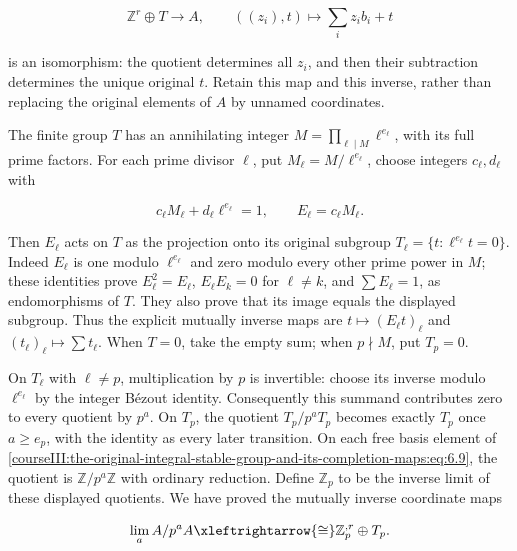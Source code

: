 \begin{equation}
\mathbb Z^r\oplus T\longrightarrow A,
 \qquad ((z_i),t)\longmapsto\sum_i z_i b_i+t
 \label{courseIII:the-original-integral-stable-group-and-its-completion-maps:eq:6.9}
\end{equation}

is an isomorphism: the quotient determines all \(z_i\), and then their subtraction determines the unique original \(t\). Retain this map and this inverse, rather than replacing the original elements of \(A\) by unnamed coordinates.

The finite group \(T\) has an annihilating integer
\(M=\prod_{\ell\mid M}\ell^{e_\ell}\), with its full prime factors. For each prime divisor \(\ell\), put \(M_\ell=M/\ell^{e_\ell}\), choose integers \(c_\ell,d_\ell\) with

\begin{equation}
c_\ell M_\ell+d_\ell\ell^{e_\ell}=1,
 \qquad E_\ell=c_\ell M_\ell.
 \label{courseIII:the-original-integral-stable-group-and-its-completion-maps:eq:6.10}
\end{equation}

Then \(E_\ell\) acts on \(T\) as the projection onto its original subgroup
\(T_\ell=\{t:\ell^{e_\ell}t=0\}\). Indeed \(E_\ell\) is one modulo \(\ell^{e_\ell}\) and zero modulo every other prime power in \(M\); these identities prove \(E_\ell^2=E_\ell\), \(E_\ell E_k=0\) for \(\ell\ne k\), and \(\sum E_\ell=1\), as endomorphisms of \(T\). They also prove that its image equals the displayed subgroup. Thus the explicit mutually inverse maps are \(t\mapsto(E_\ell t)_\ell\) and \((t_\ell)_\ell\mapsto\sum t_\ell\). When \(T=0\), take the empty sum; when \(p\nmid M\), put \(T_p=0\).

On \(T_\ell\) with \(\ell\ne p\), multiplication by \(p\) is invertible: choose its inverse modulo \(\ell^{e_\ell}\) by the integer Bézout identity. Consequently this summand contributes zero to every quotient by \(p^a\). On \(T_p\), the quotient \(T_p/p^aT_p\) becomes exactly \(T_p\) once \(a\geq e_p\), with the identity as every later transition. On each free basis element of \eqref{courseIII:the-original-integral-stable-group-and-its-completion-maps:eq:6.9}, the quotient is \(\mathbb Z/p^a\mathbb Z\) with ordinary reduction. Define \(\mathbb Z_p\) to be the inverse limit of these displayed quotients. We have proved the mutually inverse coordinate maps

\begin{equation}
\lim_a A/p^aA
 \xleftrightarrow{\cong}\mathbb Z_p^{,r}\oplus T_p.
 \label{courseIII:the-original-integral-stable-group-and-its-completion-maps:eq:6.11}
\end{equation}

